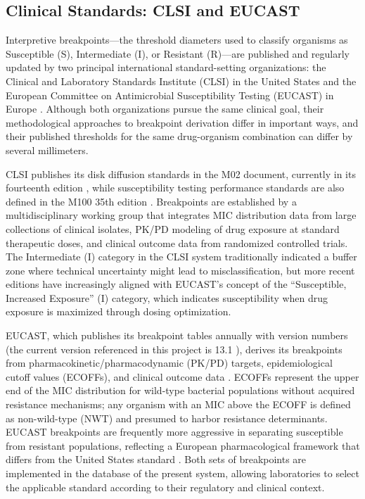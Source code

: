 \subsection{Clinical Standards: CLSI and EUCAST}

Interpretive breakpoints---the threshold diameters used to classify organisms as Susceptible (S),
Intermediate (I), or Resistant (R)---are published and regularly updated by two principal
international standard-setting organizations: the Clinical and Laboratory Standards Institute
(CLSI) in the United States and the European Committee on Antimicrobial Susceptibility Testing
(EUCAST) in Europe \cite{eucast2023}. Although both organizations pursue the same clinical goal,
their methodological approaches to breakpoint derivation differ in important ways, and their
published thresholds for the same drug-organism combination can differ by several millimeters.

CLSI publishes its disk diffusion standards in the M02 document, currently in its fourteenth
edition \cite{clsi2025}, while susceptibility testing performance standards are also defined
in the M100 35th edition \cite{clsi_m100_2025}. Breakpoints are established by a
multidisciplinary working group that integrates MIC distribution data from large collections
of clinical isolates, PK/PD modeling of drug exposure at standard therapeutic doses, and
clinical outcome data from randomized controlled trials. The Intermediate (I) category in
the CLSI system traditionally indicated a buffer zone where technical uncertainty might lead
to misclassification, but more recent editions have increasingly aligned with EUCAST's concept
of the ``Susceptible, Increased Exposure'' (I) category, which indicates susceptibility when
drug exposure is maximized through dosing optimization.

EUCAST, which publishes its breakpoint tables annually with version numbers (the current version
referenced in this project is 13.1 \cite{eucast2023}), derives its breakpoints from
pharmacokinetic/pharmacodynamic (PK/PD) targets, epidemiological cutoff values (ECOFFs), and
clinical outcome data \cite{giske2022}. ECOFFs represent the upper end of the MIC distribution
for wild-type bacterial populations without acquired resistance mechanisms; any organism with an
MIC above the ECOFF is defined as non-wild-type (NWT) and presumed to harbor resistance
determinants. EUCAST breakpoints are frequently more aggressive in separating susceptible from
resistant populations, reflecting a European pharmacological framework that differs from the
United States standard \cite{kahlmeter2019}. Both sets of breakpoints are implemented in the
database of the present system, allowing laboratories to select the applicable standard
according to their regulatory and clinical context.

